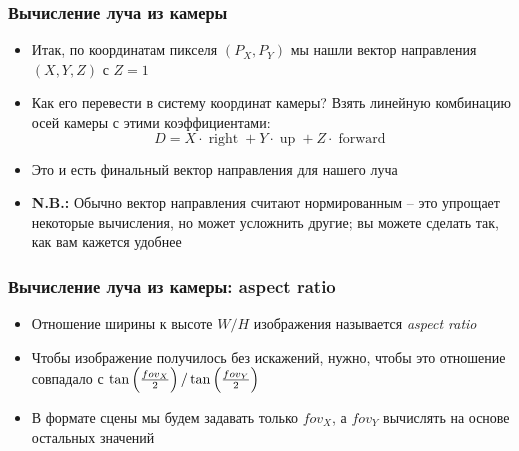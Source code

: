 \documentclass[10pt,handout]{beamer}
\begin{document}
\begin{frame}
\frametitle{Вычисление луча из камеры}
\begin{itemize}
\item Итак, по координатам пикселя \begin{math}(P_X, P_Y)\end{math} мы нашли вектор направления \begin{math}(X, Y, Z)\end{math} с \begin{math}Z=1\end{math}
\pause
\item Как его перевести в систему координат камеры? \pause Взять линейную комбинацию осей камеры с этими коэффициентами:
\begin{equation}
D = X\cdot\operatorname{right}+Y\cdot\operatorname{up}+Z\cdot\operatorname{forward}
\end{equation}
\pause
\item Это и есть финальный вектор направления для нашего луча
\pause
\item \alert{\textbf{N.B.:}} Обычно вектор направления считают нормированным -- это упрощает некоторые вычисления, но может усложнить другие; вы можете сделать так, как вам кажется удобнее
\end{itemize}
\end{frame}

\begin{frame}
\frametitle{Вычисление луча из камеры: aspect ratio}
\begin{itemize}
\item Отношение ширины к высоте \begin{math}W / H\end{math} изображения называется \textit{aspect ratio}
\pause
\item Чтобы изображение получилось без искажений, нужно, чтобы это отношение совпадало с \begin{math}\tan\left({fov_X\over 2}\right) / \tan\left({fov_Y\over 2}\right)\end{math}
\pause
\item В формате сцены мы будем задавать только \begin{math}fov_X\end{math}, а \begin{math}fov_Y\end{math} вычислять на основе остальных значений
\end{itemize}
\end{frame}
\end{document}
